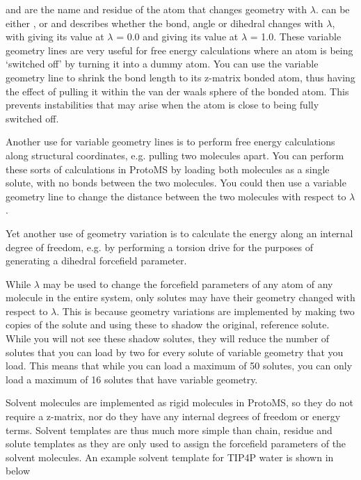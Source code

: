 \documentclass[letterpaper,10pt,english]{sphinxmanual}
\begin{document}
 and  are the name and residue of the atom that changes geometry with \(\lambda\).  can be either ,  or  and describes whether the bond, angle or dihedral changes with \(\lambda\), with  giving its value at \(\lambda\) = 0.0 and  giving its value at \(\lambda\) = 1.0. These variable geometry lines are very useful for free energy calculations where an atom is being ‘switched off’ by turning it into a dummy atom. You can use the variable geometry line to shrink the bond length to its z-matrix bonded atom, thus having the effect of pulling it within the van der waals sphere of the bonded atom. This prevents instabilities that may arise when the atom is close to being fully switched off.

Another use for variable geometry lines is to perform free energy calculations along structural coordinates, e.g. pulling two molecules apart. You can perform these sorts of calculations in ProtoMS by loading both molecules as a single solute, with no bonds between the two molecules. You could then use a variable geometry line to change the distance between the two molecules with respect to \(\lambda\).

Yet another use of geometry variation is to calculate the energy along an internal degree of freedom, e.g. by performing a torsion drive for the purposes of generating a dihedral forcefield parameter.

While \(\lambda\) may be used to change the forcefield parameters of any atom of any molecule in the entire system, only solutes may have their geometry changed with respect to \(\lambda\). This is because geometry variations are implemented by making two copies of the solute and using these to shadow the original, reference solute. While you will not see these shadow solutes, they will reduce the number of solutes that you can load by two for every solute of variable geometry that you load. This means that while you can load a maximum of 50 solutes, you can only load a maximum of 16 solutes that have variable geometry.


Solvent molecules are implemented as rigid molecules in ProtoMS, so they do not require a z-matrix, nor do they have any internal degrees of freedom or energy terms. Solvent templates are thus much more simple than chain, residue and solute templates as they are only used to assign the forcefield parameters of the solvent molecules. An example solvent template for TIP4P water is shown in below
\end{document}
